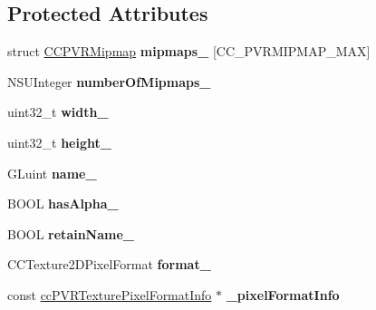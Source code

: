 \subsection*{Protected Attributes}
\begin{DoxyCompactItemize}
\item 
\hypertarget{interface_c_c_texture_p_v_r_aecd1f046efe2668a73ec2999b25f7968}{struct \hyperlink{struct_c_c_p_v_r_mipmap}{C\-C\-P\-V\-R\-Mipmap} {\bfseries mipmaps\-\_\-} \mbox{[}C\-C\-\_\-\-P\-V\-R\-M\-I\-P\-M\-A\-P\-\_\-\-M\-A\-X\mbox{]}}\label{interface_c_c_texture_p_v_r_aecd1f046efe2668a73ec2999b25f7968}

\item 
\hypertarget{interface_c_c_texture_p_v_r_a82252310b5a96299491a6cab40dae7b9}{N\-S\-U\-Integer {\bfseries number\-Of\-Mipmaps\-\_\-}}\label{interface_c_c_texture_p_v_r_a82252310b5a96299491a6cab40dae7b9}

\item 
\hypertarget{interface_c_c_texture_p_v_r_aa4d9ab9e29b70f9c623827fd4c1473b0}{uint32\-\_\-t {\bfseries width\-\_\-}}\label{interface_c_c_texture_p_v_r_aa4d9ab9e29b70f9c623827fd4c1473b0}

\item 
\hypertarget{interface_c_c_texture_p_v_r_a59a14d8aa26c048f2c482c17c120af2b}{uint32\-\_\-t {\bfseries height\-\_\-}}\label{interface_c_c_texture_p_v_r_a59a14d8aa26c048f2c482c17c120af2b}

\item 
\hypertarget{interface_c_c_texture_p_v_r_aef8db332a21b73e7895641b7861b9ff3}{G\-Luint {\bfseries name\-\_\-}}\label{interface_c_c_texture_p_v_r_aef8db332a21b73e7895641b7861b9ff3}

\item 
\hypertarget{interface_c_c_texture_p_v_r_ab6ff3b9b12d8d54d2d463a17fd66117e}{B\-O\-O\-L {\bfseries has\-Alpha\-\_\-}}\label{interface_c_c_texture_p_v_r_ab6ff3b9b12d8d54d2d463a17fd66117e}

\item 
\hypertarget{interface_c_c_texture_p_v_r_ac831ad2e53b2d41a8487e9c24bb20255}{B\-O\-O\-L {\bfseries retain\-Name\-\_\-}}\label{interface_c_c_texture_p_v_r_ac831ad2e53b2d41a8487e9c24bb20255}

\item 
\hypertarget{interface_c_c_texture_p_v_r_a61c3cf8dd7cc8a17e04f9e3a9a3c8f7f}{C\-C\-Texture2\-D\-Pixel\-Format {\bfseries format\-\_\-}}\label{interface_c_c_texture_p_v_r_a61c3cf8dd7cc8a17e04f9e3a9a3c8f7f}

\item 
\hypertarget{interface_c_c_texture_p_v_r_afd3457c1634a466142c09b6467b9a261}{const \hyperlink{struct__cc_p_v_r_texture_pixel_format_info}{cc\-P\-V\-R\-Texture\-Pixel\-Format\-Info} $\ast$ {\bfseries \-\_\-pixel\-Format\-Info}}\label{interface_c_c_texture_p_v_r_afd3457c1634a466142c09b6467b9a261}

\end{DoxyCompactItemize}
